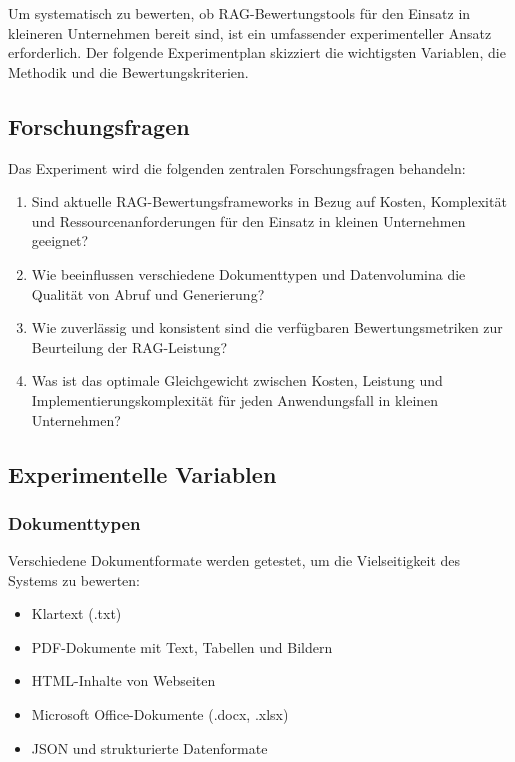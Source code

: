 Um systematisch zu bewerten, ob RAG-Bewertungstools für den Einsatz in kleineren Unternehmen bereit sind, ist ein umfassender experimenteller Ansatz erforderlich. Der folgende Experimentplan skizziert die wichtigsten Variablen, die Methodik und die Bewertungskriterien.

\subsection{Forschungsfragen}

Das Experiment wird die folgenden zentralen Forschungsfragen behandeln:

\begin{enumerate}
    \item Sind aktuelle RAG-Bewertungsframeworks in Bezug auf Kosten, Komplexität und Ressourcenanforderungen für den Einsatz in kleinen Unternehmen geeignet?
    \item Wie beeinflussen verschiedene Dokumenttypen und Datenvolumina die Qualität von Abruf und Generierung?
    \item Wie zuverlässig und konsistent sind die verfügbaren Bewertungsmetriken zur Beurteilung der RAG-Leistung?
    \item Was ist das optimale Gleichgewicht zwischen Kosten, Leistung und Implementierungskomplexität für jeden Anwendungsfall in kleinen Unternehmen?
\end{enumerate}

\subsection{Experimentelle Variablen}

\subsubsection{Dokumenttypen}
Verschiedene Dokumentformate werden getestet, um die Vielseitigkeit des Systems zu bewerten:
\begin{itemize}
    \item Klartext (.txt)
    \item PDF-Dokumente mit Text, Tabellen und Bildern
    \item HTML-Inhalte von Webseiten
    \item Microsoft Office-Dokumente (.docx, .xlsx)
    \item JSON und strukturierte Datenformate
\end{itemize}

